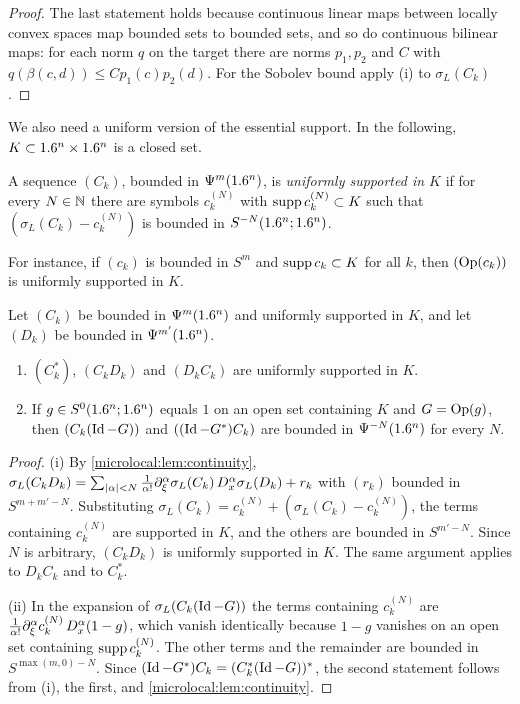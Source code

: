 \begin{proof}
  The last statement holds because continuous linear maps between locally
  convex spaces map bounded sets to bounded sets, and so do continuous bilinear
  maps: for each norm $q$ on the target there are norms $p_1,p_2$ and $C$ with
  $q(\beta(c,d))\le Cp_1(c)p_2(d)$. For the Sobolev bound apply (i) to
  $\sigma_L(C_k)$.
\end{proof}

We also need a uniform version of the essential support. In the following,
$K\subset1.6^n\times1.6^n$ is a closed set.

\begin{definition}\label{microlocal:def:uniform-support}
  A sequence $(C_k)$, bounded in $\Psi^{m}(1.6^n)$, is \emph{uniformly
  supported in $K$} if for every $N\in\mathbb{N}$ there are symbols $c^{(N)}_k$ with
  $\operatorname{supp} c^{(N)}_k\subset K$ such that $(\sigma_L(C_k)-c^{(N)}_k)$ is bounded in
  $S^{-N}(1.6^n;1.6^n)$.
\end{definition}

For instance, if $(c_k)$ is bounded in $S^m$ and $\operatorname{supp} c_k\subset K$ for all
$k$, then $(\operatorname{Op}(c_k))$ is uniformly supported in $K$.

\begin{lemma}\label{microlocal:lem:uniform-support}
  Let $(C_k)$ be bounded in $\Psi^{m}(1.6^n)$ and uniformly supported in $K$,
  and let $(D_k)$ be bounded in $\Psi^{m'}(1.6^n)$.
  \begin{enumerate}[label=\textup{(\roman*)}]
  \item $(C_k^*)$, $(C_kD_k)$ and $(D_kC_k)$ are uniformly supported in $K$.
  \item If $g\in S^0(1.6^n;1.6^n)$ equals $1$ on an open set containing $K$ and
    $G=\operatorname{Op}(g)$, then $(C_k(\operatorname{Id}-G))$ and $((\operatorname{Id}-G^*)C_k)$ are bounded in
    $\Psi^{-N}(1.6^n)$ for every $N$.
  \end{enumerate}
\end{lemma}
\begin{proof}
  (i) By \cref{microlocal:lem:continuity},
  $\sigma_L(C_kD_k)=\sum_{\lvert \alpha\rvert<N}\frac1{\alpha!}\partial^\alpha_\xi\sigma_L(C_k)\,
  D^\alpha_x\sigma_L(D_k)+r_k$ with $(r_k)$ bounded in $S^{m+m'-N}$.
  Substituting $\sigma_L(C_k)=c^{(N)}_k+(\sigma_L(C_k)-c^{(N)}_k)$, the terms
  containing $c^{(N)}_k$ are supported in $K$, and the others are bounded in
  $S^{m'-N}$. Since $N$ is arbitrary, $(C_kD_k)$ is uniformly supported in $K$.
  The same argument applies to $D_kC_k$ and to $C_k^*$.

  (ii) In the expansion of $\sigma_L(C_k(\operatorname{Id}-G))$ the terms containing
  $c^{(N)}_k$ are $\frac1{\alpha!}\partial^\alpha_\xi c^{(N)}_k\,D^\alpha_x(1-g)$, which
  vanish identically because $1-g$ vanishes on an open set containing
  $\operatorname{supp} c^{(N)}_k$. The other terms and the remainder are bounded in
  $S^{\max(m,0)-N}$. Since $(\operatorname{Id}-G^*)C_k=(C_k^*(\operatorname{Id}-G))^*$, the second statement
  follows from (i), the first, and \cref{microlocal:lem:continuity}.
\end{proof}

